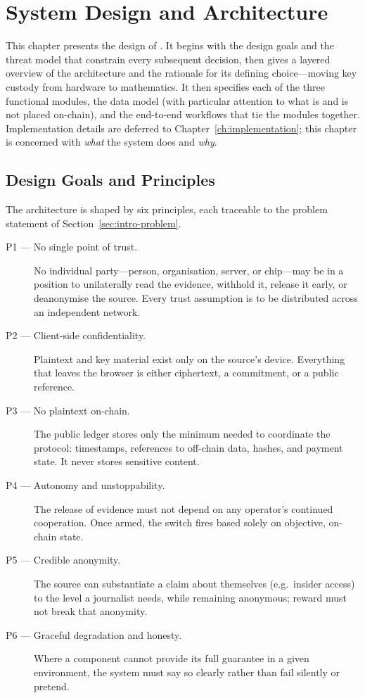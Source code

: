 \chapter{System Design and Architecture}
\label{ch:architecture}

This chapter presents the design of \zkwns. It begins with the design goals and
the threat model that constrain every subsequent decision, then gives a layered
overview of the architecture and the rationale for its defining choice---moving
key custody from hardware to mathematics. It then specifies each of the three
functional modules, the data model (with particular attention to what is and is
not placed on-chain), and the end-to-end workflows that tie the modules together.
Implementation details are deferred to Chapter~\ref{ch:implementation}; this
chapter is concerned with \emph{what} the system does and \emph{why}.

\section{Design Goals and Principles}
\label{sec:design-goals}

The architecture is shaped by six principles, each traceable to the problem
statement of Section~\ref{sec:intro-problem}.

\begin{description}
  \item[P1 --- No single point of trust.] No individual party---person,
  organisation, server, or chip---may be in a position to unilaterally read the
  evidence, withhold it, release it early, or deanonymise the source. Every
  trust assumption is to be distributed across an independent network.

  \item[P2 --- Client-side confidentiality.] Plaintext and key material exist
  only on the source's device. Everything that leaves the browser is either
  ciphertext, a commitment, or a public reference.

  \item[P3 --- No plaintext on-chain.] The public ledger stores only the minimum
  needed to coordinate the protocol: timestamps, references to off-chain data,
  hashes, and payment state. It never stores sensitive content.

  \item[P4 --- Autonomy and unstoppability.] The release of evidence must not
  depend on any operator's continued cooperation. Once armed, the switch fires
  based solely on objective, on-chain state.

  \item[P5 --- Credible anonymity.] The source can substantiate a claim about
  themselves (e.g.\ insider access) to the level a journalist needs, while
  remaining anonymous; reward must not break that anonymity.

  \item[P6 --- Graceful degradation and honesty.] Where a component cannot
  provide its full guarantee in a given environment, the system must say so
  clearly rather than fail silently or pretend.
\end{description}

